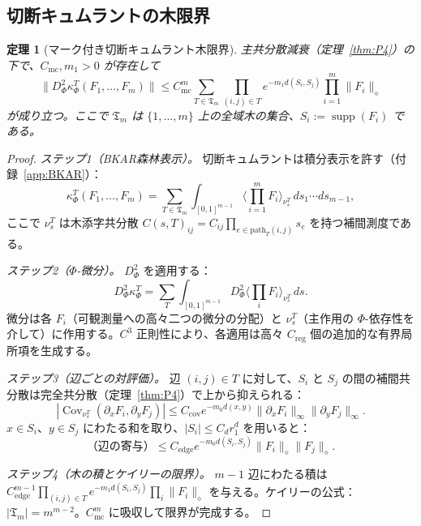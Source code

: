 \documentclass[12pt]{article}
\theoremstyle{plain}
\newtheorem{theorem}{定理}[section]
\theoremstyle{definition}
\numberwithin{equation}{section}
\newcommand{\Cov}{\operatorname{Cov}}
\newcommand{\supp}{\operatorname{supp}}
\begin{document}
\subsection{切断キュムラントの木限界}

\begin{theorem}[マーク付き切断キュムラント木限界]\label{thm:treebound}
主共分散減衰（定理~\ref{thm:P4}）の下で、$C_{\mathrm{mc}},m_1>0$ が存在して
\begin{equation}
\|D_\Phi^2\kappa_\Phi^T(F_1,\ldots,F_m)\| \leq C_{\mathrm{mc}}^m\sum_{T\in\mathfrak{T}_m}\prod_{(i,j)\in T}e^{-m_1 d(S_i,S_j)}\prod_{i=1}^m\|F_i\|_\diamond
\end{equation}
が成り立つ。ここで $\mathfrak{T}_m$ は $\{1,\ldots,m\}$ 上の全域木の集合、$S_i:=\supp(F_i)$ である。
\end{theorem}

\begin{proof}
\emph{ステップ1（BKAR森林表示）。} 切断キュムラントは積分表示を許す（付録~\ref{app:BKAR}）：
\begin{equation}
\kappa_\Phi^T(F_1,\ldots,F_m) = \sum_{T\in\mathfrak{T}_m}\int_{[0,1]^{m-1}}\Big\langle\prod_{i=1}^m F_i\Big\rangle_{\nu_s^T}\,ds_1\cdots ds_{m-1},
\end{equation}
ここで $\nu_s^T$ は木添字共分散 $C(s,T)_{ij}=C_{ij}\prod_{e\in\mathrm{path}_T(i,j)}s_e$ を持つ補間測度である。

\emph{ステップ2（$\Phi$-微分）。} $D_\Phi^2$ を適用する：
\begin{equation}
D_\Phi^2\kappa_\Phi^T = \sum_T\int_{[0,1]^{m-1}}D_\Phi^2\Big\langle\prod_i F_i\Big\rangle_{\nu_s^T}\,ds.
\end{equation}
微分は各 $F_i$（可観測量への高々二つの微分の分配）と $\nu_s^T$（主作用の $\Phi$-依存性を介して）に作用する。$C^3$ 正則性により、各適用は高々 $C_{\mathrm{reg}}$ 個の追加的な有界局所項を生成する。

\emph{ステップ3（辺ごとの対評価）。} 辺 $(i,j)\in T$ に対して、$S_i$ と $S_j$ の間の補間共分散は完全共分散（定理~\ref{thm:P4}）で上から抑えられる：
\begin{equation}
|\Cov_{\nu_s^T}(\partial_x F_i,\partial_y F_j)|\leq C_{\mathrm{cov}}e^{-m_0 d(x,y)}\|\partial_x F_i\|_\infty\|\partial_y F_j\|_\infty.
\end{equation}
$x\in S_i$、$y\in S_j$ にわたる和を取り、$|S_i|\leq C_d r_1^d$ を用いると：
\begin{equation}
\text{（辺の寄与）}\leq C_{\mathrm{edge}}e^{-m_0 d(S_i,S_j)}\|F_i\|_\diamond\|F_j\|_\diamond.
\end{equation}

\emph{ステップ4（木の積とケイリーの限界）。} $m-1$ 辺にわたる積は $C_{\mathrm{edge}}^{m-1}\prod_{(i,j)\in T}e^{-m_1 d(S_i,S_j)}\prod_i\|F_i\|_\diamond$ を与える。ケイリーの公式：$|\mathfrak{T}_m|=m^{m-2}$。$C_{\mathrm{mc}}^m$ に吸収して限界が完成する。
\end{proof}
\end{document}
